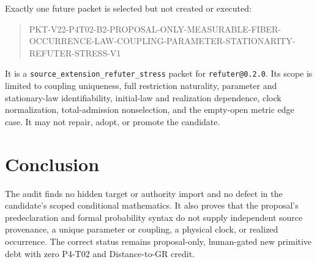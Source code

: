 \documentclass[11pt]{article}
\begin{document}
Exactly one future packet is selected but not created or executed:
\begin{quote}
\small\ttfamily
PKT-V22-P4T02-B2-PROPOSAL-ONLY-MEASURABLE-FIBER-\\
OCCURRENCE-LAW-COUPLING-PARAMETER-STATIONARITY-\\
REFUTER-STRESS-V1
\end{quote}
It is a \texttt{source\_extension\_refuter\_stress} packet for
\texttt{refuter@0.2.0}. Its scope is limited to coupling uniqueness, full
restriction naturality, parameter and stationary-law identifiability,
initial-law and realization dependence, clock normalization, total-admission
nonselection, and the empty-open metric edge case. It may not repair, adopt, or
promote the candidate.

\section{Conclusion}

The audit finds no hidden target or authority import and no defect in the
candidate's scoped conditional mathematics. It also proves that the proposal's
predeclaration and formal probability syntax do not supply independent source
provenance, a unique parameter or coupling, a physical clock, or realized
occurrence. The correct status remains proposal-only, human-gated new primitive
debt with zero P4-T02 and Distance-to-GR credit.
\end{document}
